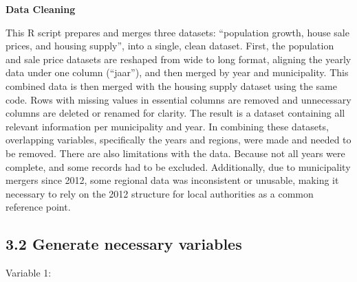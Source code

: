 \documentclass[
]{article}
\newenvironment{Shaded}{\begin{snugshade}}{\end{snugshade}}
\newcommand{\ConstantTok}[1]{\textcolor[rgb]{0.56,0.35,0.01}{#1}}
\newcommand{\NormalTok}[1]{#1}
\newcommand{\OtherTok}[1]{\textcolor[rgb]{0.56,0.35,0.01}{#1}}
\newcommand{\SpecialCharTok}[1]{\textcolor[rgb]{0.81,0.36,0.00}{\textbf{#1}}}
\begin{document}
\begin{Shaded}
\end{Shaded}

\begin{verbatim}
\end{verbatim}

\textbf{Data Cleaning}

This R script prepares and merges three datasets: ``population growth,
house sale prices, and housing supply'', into a single, clean dataset.
First, the population and sale price datasets are reshaped from wide to
long format, aligning the yearly data under one column (``jaar''), and
then merged by year and municipality. This combined data is then merged
with the housing supply dataset using the same code. Rows with missing
values in essential columns are removed and unnecessary columns are
deleted or renamed for clarity. The result is a dataset containing all
relevant information per municipality and year. In combining these
datasets, overlapping variables, specifically the years and regions,
were made and needed to be removed. There are also limitations with the
data. Because not all years were complete, and some records had to be
excluded. Additionally, due to municipality mergers since 2012, some
regional data was inconsistent or unusable, making it necessary to rely
on the 2012 structure for local authorities as a common reference point.

\subsection{3.2 Generate necessary
variables}\label{generate-necessary-variables}

Variable 1:
\end{document}
